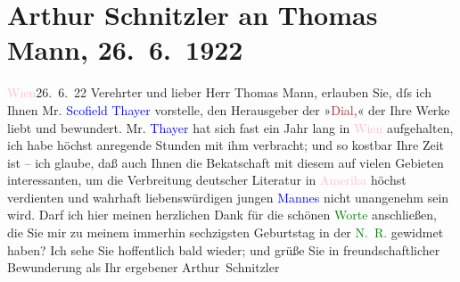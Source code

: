 

               \section[Arthur Schnitzler an Thomas Mann, 26. 6. 1922]{ Arthur Schnitzler an Thomas Mann, 26. 6. 1922}\nopagebreak{}\rehead{ }\normalsize\beginnumbering{} \toendnotes[C]{\smallbreak\pagebreak[2]} 
\toendnotes[C]{\smallbreak}\pstart
           \raggedleft{}{\pb}\textcolor{pink}{Wien}{}\ledrightnote{\textcolor{pink}{Wien}}{ }26. 6. 22\pend
           \pstart
           Verehrter und lieber Herr Thomas Mann, erlauben Sie, dſs ich
                    Ihnen Mr. \textcolor{blue}{Scofield Thayer}{}\ledrightnote{\textcolor{blue}{Scofield Thayer}} vorstelle, den
                    Herausgeber der »\textcolor{brown}{Dial}{}\ledrightnote{\textcolor{brown}{The Dial}},« der Ihre Werke liebt
                    und bewundert. Mr. \textcolor{blue}{Thayer}{}\ledrightnote{\textcolor{blue}{Scofield Thayer}} hat sich fast ein
                    Jahr lang in \textcolor{pink}{Wien}{}\ledrightnote{\textcolor{pink}{Wien}} aufgehalten, ich habe höchst
                    anregende Stunden mit ihm verbracht; und so kostbar Ihre Zeit ist – ich glaube,
                    daß auch Ihnen die Beka{\geminationn}tschaft mit diesem auf
                    vielen Gebieten interessanten, um die {\pb}Verbreitung deutscher Literatur in \textcolor{pink}{Amerika}{}\ledrightnote{\textcolor{pink}{Amerika}}
                    höchst verdienten und wahrhaft liebenswürdigen jungen \textcolor{blue}{Mannes}{} nicht unangenehm sein wird.\pend
           \pstart
           Darf ich hier meinen herzlichen Dank für die schönen \textcolor{green}{Worte}{} anschließen, die Sie mir zu meinem immerhin
                    sechzigsten Geburtstag in der \textcolor{green}{N. R.}{}\ledrightnote{\textcolor{green}{Die neue Rundschau}} gewidmet
                    haben?\pend
           \pstart
           Ich sehe Sie hoffentlich bald wieder; und grüße Sie in freundschaftlicher
                    Bewunderung als Ihr ergebener \spacefill\mbox{Arthur Schnitzler}\pend
           \endnumbering{}  
      